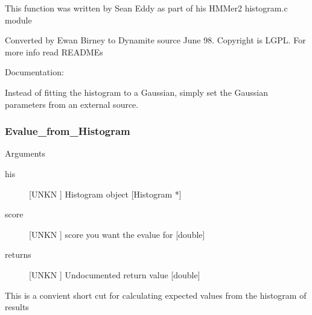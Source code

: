 This function was written by Sean Eddy
as part of his HMMer2 histogram.c module


Converted by Ewan Birney to Dynamite source June 98.
Copyright is LGPL. For more info read READMEs


Documentation:


Instead of fitting the histogram to a Gaussian,
simply set the Gaussian parameters from an external source.


\subsubsection{Evalue_from_Histogram}

Arguments
\begin{description}
\item[his] [UNKN ] Histogram object [Histogram *]
\item[score] [UNKN ] score you want the evalue for [double]
\item[returns] [UNKN ] Undocumented return value [double]
\end{description}


This is a convient short cut for calculating
expected values from the histogram of results


